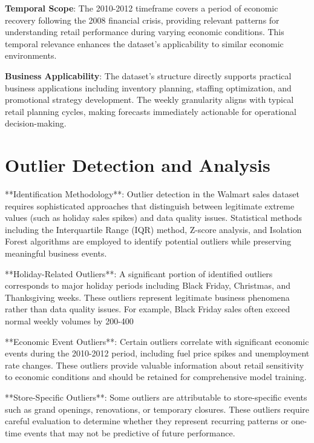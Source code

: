 \textbf{Temporal Scope}: The 2010-2012 timeframe covers a period of economic recovery following the 2008 financial crisis, providing relevant patterns for understanding retail performance during varying economic conditions. This temporal relevance enhances the dataset's applicability to similar economic environments.

\textbf{Business Applicability}: The dataset's structure directly supports practical business applications including inventory planning, staffing optimization, and promotional strategy development. The weekly granularity aligns with typical retail planning cycles, making forecasts immediately actionable for operational decision-making.

\section{Outlier Detection and Analysis}

**Identification Methodology**: Outlier detection in the Walmart sales dataset requires sophisticated approaches that distinguish between legitimate extreme values (such as holiday sales spikes) and data quality issues. Statistical methods including the Interquartile Range (IQR) method, Z-score analysis, and Isolation Forest algorithms are employed to identify potential outliers while preserving meaningful business events.

**Holiday-Related Outliers**: A significant portion of identified outliers corresponds to major holiday periods including Black Friday, Christmas, and Thanksgiving weeks. These outliers represent legitimate business phenomena rather than data quality issues. For example, Black Friday sales often exceed normal weekly volumes by 200-400%

**Economic Event Outliers**: Certain outliers correlate with significant economic events during the 2010-2012 period, including fuel price spikes and unemployment rate changes. These outliers provide valuable information about retail sensitivity to economic conditions and should be retained for comprehensive model training.

**Store-Specific Outliers**: Some outliers are attributable to store-specific events such as grand openings, renovations, or temporary closures. These outliers require careful evaluation to determine whether they represent recurring patterns or one-time events that may not be predictive of future performance.


